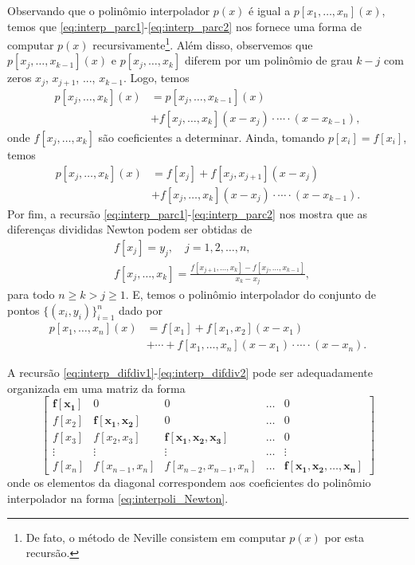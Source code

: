 Observando que o polinômio interpolador $p(x)$ é igual a $p[x_1,\dotsc,x_n](x)$, temos que \eqref{eq:interp_parc1}-\eqref{eq:interp_parc2} nos fornece uma forma de computar $p(x)$ recursivamente\footnote{De fato, o método de Neville consistem em computar $p(x)$ por esta recursão.}. Além disso, observemos que $p[x_j,\dotsc,x_{k-1}](x)$ e $p[x_j,\dotsc,x_k]$ diferem por um polinômio de grau $k-j$ com zeros $x_j$, $x_{j+1}$, ..., $x_{k-1}$. Logo, temos
\begin{align}
  p[x_j,\dotsc,x_k](x) &= p[x_j,\dotsc,x_{k-1}](x) \nonumber \\
                       &+ f[x_j,\dotsc,x_k](x-x_j)\cdot\cdots\cdot(x-x_{k-1}),
\end{align}
onde $f[x_j,\dotsc,x_k]$ são coeficientes a determinar. Ainda, tomando $p[x_i]=f[x_i]$, temos
\begin{align}
  p[x_j,\dotsc,x_k](x) &= f[x_j] + f[x_j,x_{j+1}](x-x_j) \nonumber \\
                       &+ f[x_j,\dotsc,x_k](x-x_j)\cdot\cdots\cdot(x-x_{k-1}).
\end{align}
Por fim, a recursão \eqref{eq:interp_parc1}-\eqref{eq:interp_parc2} nos mostra que as diferenças divididas Newton podem ser obtidas de
\begin{align}
  &f[x_j] = y_j,\quad j=1,2,\dotsc,n,\label{eq:interp_difdiv1}\\
  &f[x_j,\dotsc,x_k] = \frac{f[x_{j+1},\dotsc,x_k]-f[x_j,\dotsc,x_{k-1}]}{x_k-x_j},\label{eq:interp_difdiv2}
\end{align}
para todo $n\geq k>j\geq 1$. E, temos o polinômio interpolador do conjunto de pontos $\{(x_i,y_i)\}_{i=1}^n$ dado por
\begin{align}\label{eq:interpoli_Newton}
  p[x_1,\dotsc,x_n](x) &= f[x_1] + f[x_1,x_2](x-x_1) \nonumber \\
                       &+\cdots + f[x_1,\dotsc,x_n](x-x_1)\cdot\cdots\cdot(x-x_n).  
\end{align}

\begin{obs}
  A recursão \eqref{eq:interp_difdiv1}-\eqref{eq:interp_difdiv2} pode ser adequadamente organizada em uma matriz da forma
  \begin{equation}
    \begin{bmatrix}
      \pmb{f[x_1]} & 0 & 0 & \ldots & 0 \\
      f[x_2] & \pmb{f[x_1,x_2]} & 0 & \ldots & 0 \\
      f[x_3] & f[x_2,x_3] & \pmb{f[x_1,x_2,x_3]} & \ldots & 0\\
      \vdots & \vdots & \vdots & \ldots & \vdots \\
      f[x_n] & f[x_{n-1},x_{n}] & f[x_{n-2},x_{n-1},x_n] & \ldots & \pmb{f[x_1,x_2,\dotsc,x_n]}
    \end{bmatrix}
  \end{equation}
onde os elementos da diagonal correspondem aos coeficientes do polinômio interpolador na forma \eqref{eq:interpoli_Newton}.
\end{obs}


